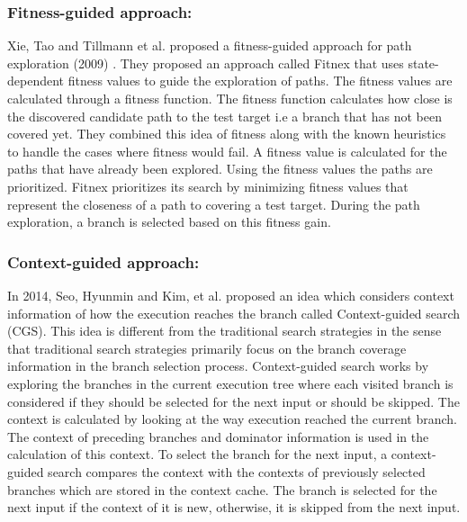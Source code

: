 \documentclass[ runningheads,
               a4paper]{llncs}
\begin{document}
\subsubsection{Fitness-guided approach:}
Xie, Tao and Tillmann et al. proposed a fitness-guided approach for path exploration (2009) \cite{xie2009fitness}. They proposed an approach called Fitnex that uses state-dependent fitness values to guide the exploration of paths. The fitness values are calculated through a fitness function. The fitness function calculates how close is the discovered candidate path to the test target i.e a branch that has not been covered yet. They combined this idea of fitness along with the known heuristics to handle the cases where fitness would fail. A fitness value is calculated for the paths that have already been explored. Using the fitness values the paths are prioritized. Fitnex prioritizes its search by minimizing fitness values that represent the closeness of a path to covering a test target. During the path exploration, a branch is selected based on this fitness gain.


\subsubsection{Context-guided approach:}
In 2014, Seo, Hyunmin and Kim, et al. proposed an idea \cite{seo2014we} which considers context information of how the execution reaches the branch called Context-guided search (CGS). This idea is different from the traditional search strategies in the sense that traditional search strategies primarily focus on the branch coverage information in the branch selection process. Context-guided search works by exploring the branches in the current execution tree where each visited branch is considered if they should be selected for the next input or should be skipped. The context is calculated by looking at the way execution reached the current branch. The context of preceding branches and dominator information is used in the calculation of this context. To select the branch for the next input, a context-guided search compares the context with the contexts of previously selected branches which are stored in the context cache. The branch is selected for the next input if the context of it is new, otherwise, it is skipped from the next input.
\end{document}
